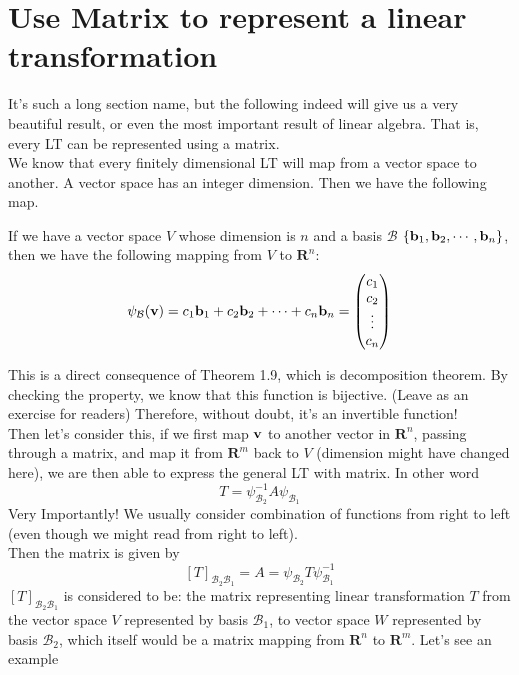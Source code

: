 \section{Use Matrix to represent a linear transformation}
It's such a long section name, but the following indeed will give us a very beautiful result, or even the most important result of linear algebra. That is, every LT can be represented using a matrix.\\

We know that every finitely dimensional LT will map from a vector space to another. A vector space has an integer dimension. Then we have the following map.\\
\begin{theorem}
    If we have a vector space $V$ whose dimension is $n$ and a basis $\mathcal{B}$ $\{\mathbf{b}_1,\mathbf{b}_2,\cdots,\mathbf{b}_n\}$, then we have the following mapping from $V$ to $\mathbf{R}^n$:
    $$\psi_{\mathcal{B}}(\mathbf{v}) = c_1\mathbf{b}_1+c_2\mathbf{b}_2+\cdots+c_n \mathbf{b}_n = \begin{pmatrix}
        c_1\\c_2\\ \vdots\\c_n
    \end{pmatrix}$$
\end{theorem}
This is a direct consequence of Theorem 1.9, which is decomposition theorem. By checking the property, we know that this function is bijective. (Leave as an exercise for readers) Therefore, without doubt, it's an invertible function! \\

Then let's consider this, if we first map $\mathbf{v}$ to another vector in $\mathbf{R}^n$, passing through a matrix, and map it from $\mathbf{R}^m$ back to $V$ (dimension might have changed here), we are then able to express the general LT with matrix. In other word $$T = \psi^{-1}_{\mathcal{B}_2}A\psi_{\mathcal{B}_1}$$
Very Importantly! We usually consider combination of functions from right to left (even though we might read from right to left).\\

Then the matrix is given by
$$[T]_{\mathcal{B}_2\mathcal{B}_1} = A = \psi_{\mathcal{B}_2}T\psi_{\mathcal{B}_1}^{-1}$$ 
$[T]_{\mathcal{B}_2\mathcal{B}_1}$ is considered to be: the matrix representing linear transformation $T$ from the vector space $V$ represented by basis $\mathcal{B}_1$, to vector space $W$ represented by basis $\mathcal{B}_2$, which itself would be a matrix mapping from $\mathbf{R}^n$ to $\mathbf{R}^m$. Let's see an example~
